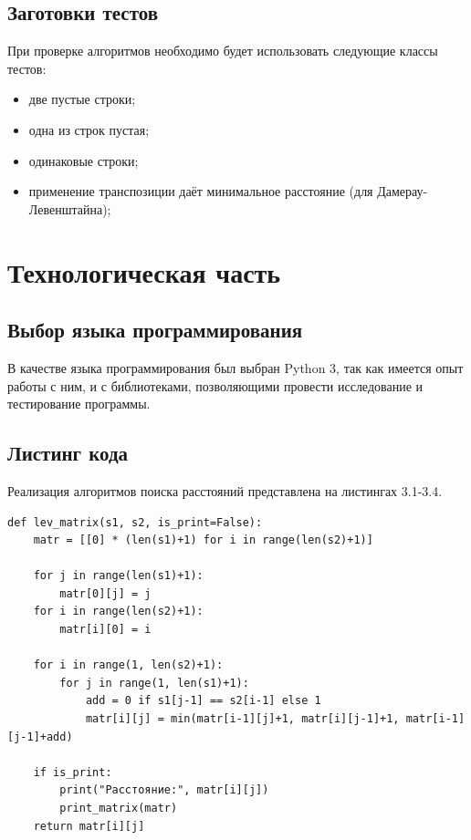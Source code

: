 \documentclass[10pt,a4paper]{report}
\begin{document}
	\section{Заготовки тестов}
	При проверке алгоритмов необходимо будет использовать следующие классы тестов:
	\begin{itemize}
		\item две пустые строки;
		\item одна из строк пустая;
		\item одинаковые строки;
		\item применение транспозиции даёт минимальное расстояние (для Дамерау-Левенштайна);
	\end{itemize}



	\newpage
	\chapter{Технологическая  часть}
	
	\section{Выбор языка программирования}
	В качестве языка программирования был выбран Python 3, так как имеется опыт работы с ним, и с библиотеками, позволяющими провести исследование и тестирование программы.
	
	\section{Листинг кода}
	Реализация алгоритмов поиска расстояний представлена на листингах 3.1-3.4.
	
	\begin{lstlisting}[caption = Функция нахождения расстояния Левенштейна матричным методом.]
def lev_matrix(s1, s2, is_print=False):
	matr = [[0] * (len(s1)+1) for i in range(len(s2)+1)]
	
	for j in range(len(s1)+1):
		matr[0][j] = j
	for i in range(len(s2)+1):
		matr[i][0] = i
	
	for i in range(1, len(s2)+1):
		for j in range(1, len(s1)+1):
			add = 0 if s1[j-1] == s2[i-1] else 1
			matr[i][j] = min(matr[i-1][j]+1, matr[i][j-1]+1, matr[i-1][j-1]+add)
	
	if is_print:
		print("Расстояние:", matr[i][j])
		print_matrix(matr)
	return matr[i][j]
	\end{lstlisting}
	\newpage
\end{document}

